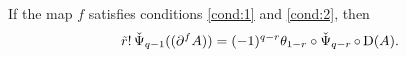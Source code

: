 %

\begin{lemma} If the map $f$ satisfies conditions \eqref{cond:1} and \eqref{cond:2}, then
	\[
	\tilde{r}!\operatorname{\check{\Psi}}_{q-1}((\partial^{f} A)) = (-1)^{q-r}\theta_{1-r}\circ \operatorname{\check{\Psi}}_{q-r}\circ\operatorname{D}(A).
	\]
\end{lemma}

